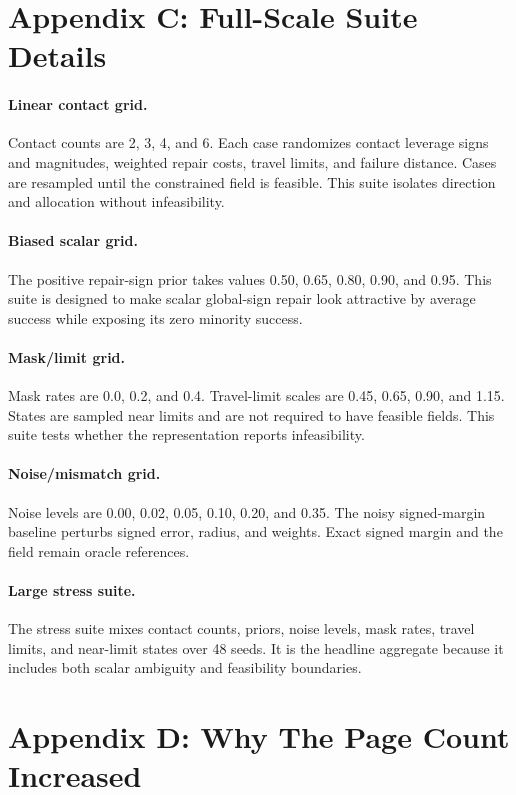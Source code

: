 \documentclass{article}
\begin{document}
\section{Appendix C: Full-Scale Suite Details}

\paragraph{Linear contact grid.}
Contact counts are 2, 3, 4, and 6. Each case randomizes contact leverage signs and magnitudes, weighted repair costs, travel limits, and failure distance. Cases are resampled until the constrained field is feasible. This suite isolates direction and allocation without infeasibility.

\paragraph{Biased scalar grid.}
The positive repair-sign prior takes values 0.50, 0.65, 0.80, 0.90, and 0.95. This suite is designed to make scalar global-sign repair look attractive by average success while exposing its zero minority success.

\paragraph{Mask/limit grid.}
Mask rates are 0.0, 0.2, and 0.4. Travel-limit scales are 0.45, 0.65, 0.90, and 1.15. States are sampled near limits and are not required to have feasible fields. This suite tests whether the representation reports infeasibility.

\paragraph{Noise/mismatch grid.}
Noise levels are 0.00, 0.02, 0.05, 0.10, 0.20, and 0.35. The noisy signed-margin baseline perturbs signed error, radius, and weights. Exact signed margin and the field remain oracle references.

\paragraph{Large stress suite.}
The stress suite mixes contact counts, priors, noise levels, mask rates, travel limits, and near-limit states over 48 seeds. It is the headline aggregate because it includes both scalar ambiguity and feasibility boundaries.

\section{Appendix D: Why The Page Count Increased}
\end{document}
